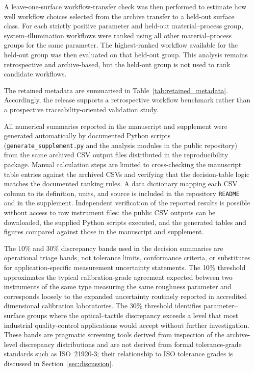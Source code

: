 \documentclass{article}
\begin{document}
A leave-one-surface workflow-transfer check was then performed to estimate how well workflow choices selected from the archive transfer to a held-out surface class. For each strictly positive parameter and held-out material--process group, system--illumination workflows were ranked using all other material--process groups for the same parameter. The highest-ranked workflow available for the held-out group was then evaluated on that held-out group. This analysis remains retrospective and archive-based, but the held-out group is not used to rank candidate workflows.

The retained metadata are summarised in Table~\ref{tab:retained_metadata}. Accordingly, the release supports a retrospective workflow benchmark rather than a prospective traceability-oriented validation study.

All numerical summaries reported in the manuscript and supplement were generated automatically by documented Python scripts (\texttt{generate\_supplement.py} and the analysis modules in the public repository) from the same archived CSV output files distributed in the reproducibility package. Manual calculation steps are limited to cross-checking the manuscript table entries against the archived CSVs and verifying that the decision-table logic matches the documented ranking rules. A data dictionary mapping each CSV column to its definition, units, and source is included in the repository \texttt{README} and in the supplement. Independent verification of the reported results is possible without access to raw instrument files: the public CSV outputs can be downloaded, the supplied Python scripts executed, and the generated tables and figures compared against those in the manuscript and supplement.

The 10\% and 30\% discrepancy bands used in the decision summaries are operational triage bands, not tolerance limits, conformance criteria, or substitutes for application-specific measurement uncertainty statements. The 10\% threshold approximates the typical calibration-grade agreement expected between two instruments of the same type measuring the same roughness parameter and corresponds loosely to the expanded uncertainty routinely reported in accredited dimensional calibration laboratories. The 30\% threshold identifies parameter--surface groups where the optical--tactile discrepancy exceeds a level that most industrial quality-control applications would accept without further investigation. These bands are pragmatic screening tools derived from inspection of the archive-level discrepancy distributions and are not derived from formal tolerance-grade standards such as ISO~21920-3; their relationship to ISO tolerance grades is discussed in Section~\ref{sec:discussion}.
\end{document}

